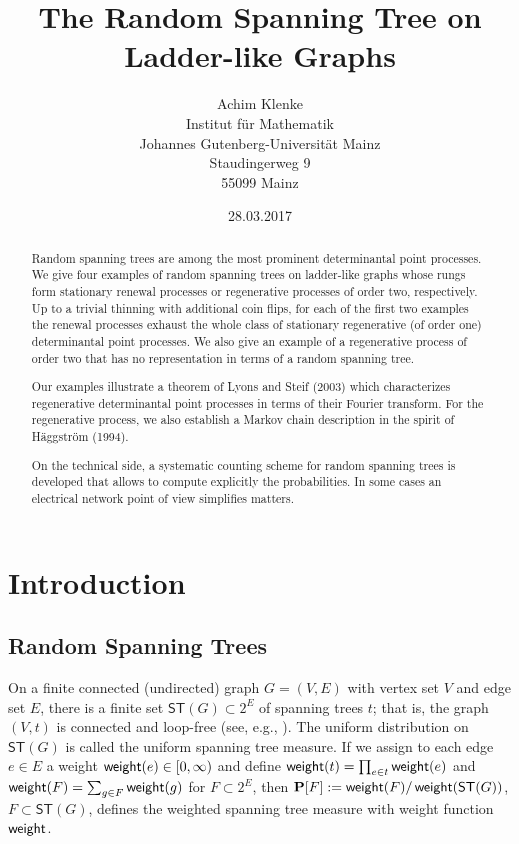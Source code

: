 \documentclass[11pt]{article}
\providecommand{\1}{\mathBB{1}}
\renewcommand{\P}{\mathbf{P}}
\def\SPT{\mathsf{ST}}
\newcommand{\Section}[1]{\section{#1}\setcounter{figure}{0}\setcounter{table}{0}\setcounter{equation}{0}}
\newcommand{\weight}{\mathop{\mbox{\sf weight}}}
\begin{document}
\title{The Random Spanning Tree on Ladder-like Graphs}
\author{
Achim Klenke\\
Institut f\"{u}r Mathematik\\
Johannes Gutenberg-Universit\"{a}t Mainz\\
Staudingerweg 9\\
55099 Mainz}
\date{\small  28.03.2017}
\maketitle
\begin{abstract}
Random spanning trees are among the most prominent determinantal point processes. We give four examples of random spanning trees on ladder-like graphs whose rungs form stationary renewal processes or regenerative processes of order two, respectively. Up to a trivial thinning with additional coin flips, for each of the first two examples the renewal processes exhaust the whole class of stationary regenerative (of order one) determinantal point processes. We also give an example of a regenerative process of order two that has no representation in terms of a random spanning tree.

Our examples illustrate a theorem of Lyons and Steif (2003) which characterizes regenerative determinantal point processes in terms of their Fourier transform.  For the regenerative process, we also establish a Markov chain description in the spirit of H\"{a}ggstr\"{o}m (1994).

On the technical side, a systematic counting scheme for random spanning trees is developed that allows to compute explicitly the probabilities. In some cases an electrical network point of view simplifies matters. \end{abstract}
\Section{Introduction}
\label{S1}
\subsection{Random Spanning Trees}
\label{S1.1}
On a finite connected (undirected) graph $G=(V,E)$ with vertex set $V$ and edge set $E$, there is a finite set $\SPT(G)\subset 2^E$ of spanning trees $t$; that is, the graph $(V,t)$ is connected and loop-free (see, e.g., \cite{Bollobas1998}). The uniform distribution on $\SPT(G)$ is called the uniform spanning tree measure. If we assign to each edge $e\in E$ a weight $\weight(e)\in[0,\infty)$ and define $\weight(t)=\prod_{e\in t}\weight(e)$ and $\weight(F)=\sum_{g\in F}\weight(g)$ for $F\subset 2^E$, then $\P[F]:=\weight(F)/\weight(\SPT(G))$, $F\subset\SPT(G)$, defines the weighted spanning tree measure with weight function $\weight$.
\end{document}
